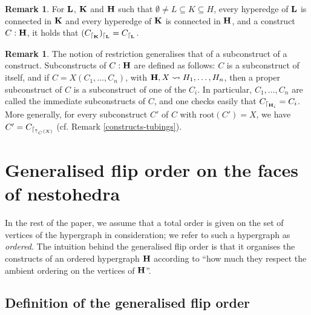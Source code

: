 \documentclass{article}
\theoremstyle{plain}
\theoremstyle{definition}
\newtheorem{remark}[thm]{Remark}
\newcommand{\hyper}[1]{{\bf #1}}
\newcommand{\restrconstr}[2]{{#1}_{\lceil_{#2}}}
\def\mathraise#1#2#3#4{
\mathchoice
{\raisebox{#2}{$\displaystyle{#1}$}}
{\raisebox{#2}{$#1$}}
{\raisebox{#3}{$\scriptstyle{#1}$}}
{\raisebox{#4}{$\scriptscriptstyle{#1}$}}
}
\def\mathraiseord#1#2#3#4{\mathord{\mathraise#1{#2}{#3}{#4}}}
\def\valup{\mathraiseord{\uparrow}{0.29ex}{0.21ex}{0.16ex}}
\begin{document}
\begin{remark}\label{rest1}
For ${\bf L}$, ${\bf K}$ and ${\bf H}$ such that $\emptyset \neq L\subseteq K\subseteq H$, every hyperedge of ${\bf L}$ is connected in $\hyper{K}$ and every hyperedge of ${\bf K}$ is connected in $\hyper{H}$, and a construct $C:{\bf H}$, it holds that $(C_{\lceil_{\bf K}})_{\lceil_{\bf L}}=C_{\lceil_{\bf L}}$.
\end{remark}
\begin{remark} 
The notion of restriction generalises that of a subconstruct of a construct. Subconstructs of $C:\hyper{H}$ are defined as follows: $C$ is a subconstruct of itself, and if $C=X(C_1,\ldots,C_n)$, with $\hyper{H},X\leadsto H_1,\ldots, H_n$, then a proper subconstruct of $C$ is a subconstruct of one of the $C_i$. In particular, $C_1,\ldots,C_n$ are called the immediate subconstructs of $C$, and one checks easily that $\restrconstr{C}{{{\bf H}_i}}=C_i$. More generally, for every subconstruct $C'$ of $C$ with $\textrm{root}(C')=X$, we have $C'=\restrconstr{C}{{\valup_C(X)}}$ (cf. Remark \ref{constructs-tubings}).
\end{remark}

\section{Generalised flip order on the faces of nestohedra} \label{GFO-section}
In the rest of the paper, we assume that a total order is given on the set of vertices of the hypergraph in consideration; we refer to such a hypergraph as {\em ordered}. The intuition behind the generalised flip order is that it organises the constructs of an ordered hypergraph ${\bf H}$ according to ``how much they respect the ambient ordering on the vertices of ${\bf H}$''.
\subsection{Definition of the generalised flip order}\label{gfo_def}
\end{document}
